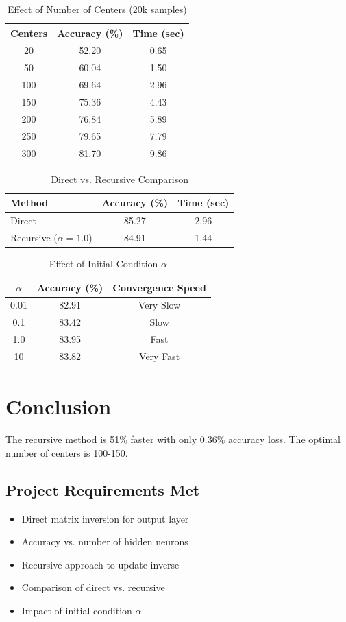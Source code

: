 \documentclass[12pt]{article}
\begin{document}
\begin{table}[H]
\centering
\caption{Effect of Number of Centers (20k samples)}
\begin{tabular}{ccc}
\toprule
Centers & Accuracy (\%) & Time (sec) \\
\midrule
20 & 52.20 & 0.65 \\
50 & 60.04 & 1.50 \\
100 & 69.64 & 2.96 \\
150 & 75.36 & 4.43 \\
200 & 76.84 & 5.89 \\
250 & 79.65 & 7.79 \\
300 & 81.70 & 9.86 \\
\bottomrule
\end{tabular}
\end{table}

\begin{table}[H]
\centering
\caption{Direct vs. Recursive Comparison}
\begin{tabular}{lcc}
\toprule
Method & Accuracy (\%) & Time (sec) \\
\midrule
Direct & 85.27 & 2.96 \\
Recursive ($\alpha=1.0$) & 84.91 & 1.44 \\
\bottomrule
\end{tabular}
\end{table}

\begin{table}[H]
\centering
\caption{Effect of Initial Condition $\alpha$}
\begin{tabular}{ccc}
\toprule
$\alpha$ & Accuracy (\%) & Convergence Speed \\
\midrule
0.01 & 82.91 & Very Slow \\
0.1 & 83.42 & Slow \\
1.0 & 83.95 & Fast \\
10 & 83.82 & Very Fast \\
\bottomrule
\end{tabular}
\end{table}

\section{Conclusion}
The recursive method is 51\% faster with only 0.36\% accuracy loss. The optimal number of centers is 100-150.

\subsection*{Project Requirements Met}
\begin{itemize}
\item Direct matrix inversion for output layer
\item Accuracy vs. number of hidden neurons
\item Recursive approach to update inverse
\item Comparison of direct vs. recursive
\item Impact of initial condition $\alpha$
\end{itemize}
\end{document}
